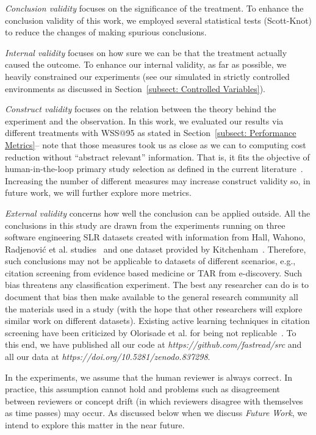 \documentclass{svjour3}
\theoremstyle{break}
\begin{document}
{\em Conclusion validity} focuses on the significance of the treatment. To
enhance the conclusion validity of this work, we employed several statistical
tests (Scott-Knot) to reduce the changes of making spurious conclusions. 

{\em Internal validity} focuses on how sure we can be that the treatment
actually caused the outcome. To enhance our internal validity,
as far as possible, we heavily constrained our experiments
(see  our simulated in strictly controlled environments as discussed in Section~\ref{subsect: Controlled Variables}).

{\em Construct validity} focuses on the relation between the theory
behind the experiment and the observation. In this work, we evaluated
our results via different treatments with WSS@95 as stated in Section~\ref{subsect: Performance Metrics}-- note that those
measures took us as close as we can to computing
cost reduction without ``abstract relevant'' information. 
That is, it fits the objective of human-in-the-loop primary study selection as defined in the current literature~\cite{tredennick2015,cormack2015autonomy,cormack2014evaluation}. Increasing the number of different measures may increase construct validity
so, in future work, we will further explore more metrics.

{\em External validity }concerns how well the conclusion can be applied outside. All the conclusions in this study are drawn from the experiments running on three software engineering SLR datasets created with information from Hall, Wahono, Radjenovi{\'c} et al. studies~\cite{hall2012systematic,wahono2015systematic,radjenovic2013software} and one dataset provided by Kitchenham~\cite{kitchenham2010systematic}. Therefore, such conclusions may not be applicable to datasets of different scenarios, e.g., citation screening from evidence based medicine or TAR from e-discovery. Such bias threatens any classification experiment. The best any researcher can do is to document that bias then make available to the general research community all the materials used in a study (with the hope that other researchers will explore similar work on different datasets). Existing active learning techniques in citation screening have been criticized by Olorisade et al. for being not replicable~\cite{olorisade2016critical,olorisade2017reproducibility}. To this end, we have published all our code at \textit{https://github.com/fastread/src} and all our data at \textit{https://doi.org/10.5281/zenodo.837298}.

In the experiments, we assume that the human reviewer is always correct. In practice, this assumption cannot hold and problems such as disagreement between reviewers or concept drift (in which reviewers disagree with themselves as time passes) may occur.  As discussed
below when we discuss {\em Future Work}, we intend to explore this matter in the near future.
\end{document}
